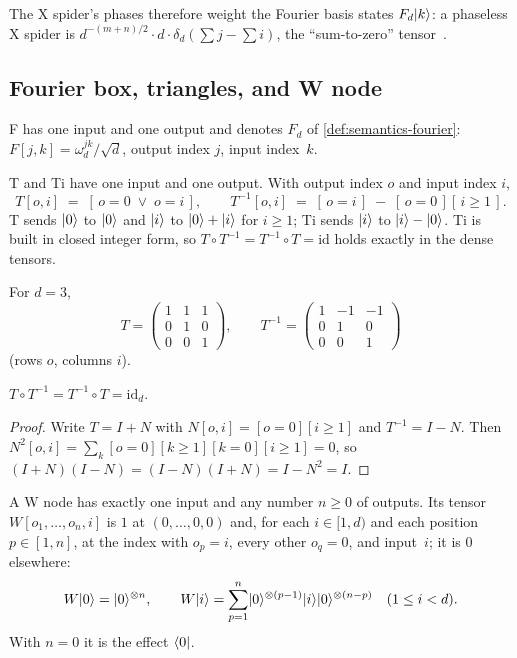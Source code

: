 The X spider's phases therefore weight the Fourier basis states $F_d\lvert k \rangle$: a phaseless X spider is $d^{-(m+n)/2}\cdot d\cdot\delta_d(\sum j-\sum i)$, the ``sum-to-zero'' tensor~\cite{wang2023qufinitezxw,poor2023qupit}.

\subsection{Fourier box, triangles, and W node}

\begin{definition}\label{def:semantics-f}
F has one input and one output and denotes $F_d$ of \cref{def:semantics-fourier}: $F[j,k]=\omega_d^{jk}/\sqrt d$, output index $j$, input index~$k$.
\end{definition}

\begin{definition}\label{def:semantics-triangle}
T and Ti have one input and one output. With output index $o$ and input index $i$,
\[
T[o,i] \;=\; [\,o=0 \;\lor\; o=i\,],\qquad
T^{-1}[o,i] \;=\; [\,o=i\,]\;-\;[\,o=0\,][\,i\ge 1\,].
\]
T sends $\lvert 0 \rangle$ to $\lvert 0 \rangle$ and $\lvert i \rangle$ to $\lvert 0 \rangle+\lvert i \rangle$ for $i\ge 1$; Ti sends $\lvert i \rangle$ to $\lvert i \rangle-\lvert 0 \rangle$. Ti is built in closed integer form, so $T\circ T^{-1}=T^{-1}\circ T=\mathrm{id}$ holds exactly in the dense tensors.
\end{definition}

For $d=3$,
\[
T=\begin{pmatrix}1&1&1\\0&1&0\\0&0&1\end{pmatrix},\qquad
T^{-1}=\begin{pmatrix}1&-1&-1\\0&1&0\\0&0&1\end{pmatrix}
\]
(rows $o$, columns $i$).

\begin{proposition}\label{prop:semantics-triangle-inverse}
$T\circ T^{-1}=T^{-1}\circ T=\mathrm{id}_d$.
\end{proposition}
\begin{proof}
Write $T=I+N$ with $N[o,i]=[o=0][i\ge1]$ and $T^{-1}=I-N$. Then $N^2[o,i]=\sum_k[o=0][k\ge1][k=0][i\ge1]=0$, so $(I+N)(I-N)=(I-N)(I+N)=I-N^2=I$.
\end{proof}

\begin{definition}[W node]\label{def:semantics-w}
A W node has exactly one input and any number $n\ge 0$ of outputs. Its tensor $W[o_1,\dots,o_n,i]$ is $1$ at $(0,\dots,0,0)$ and, for each $i\in[1,d)$ and each position $p\in[1,n]$, at the index with $o_p=i$, every other $o_q=0$, and input~$i$; it is $0$ elsewhere:
\[
W\lvert 0 \rangle=\lvert 0 \rangle^{\otimes n},\qquad
W\lvert i \rangle=\sum_{p=1}^{n}\lvert 0 \rangle^{\otimes (p-1)}\lvert i \rangle\lvert 0 \rangle^{\otimes(n-p)}\quad(1\le i<d).
\]
With $n=0$ it is the effect $\langle 0 \rvert$.
\end{definition}

